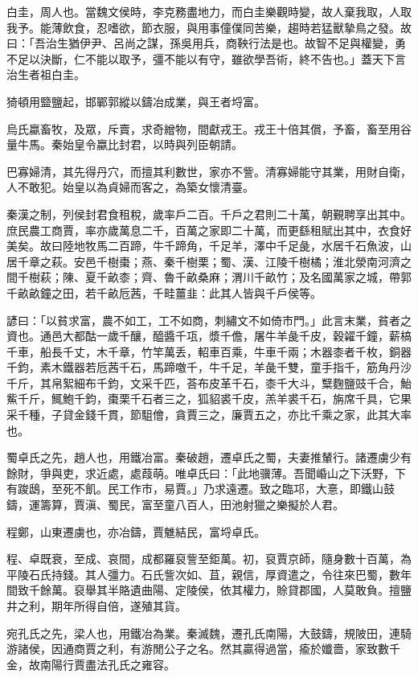 \begin{pinyinscope}
白圭，周人也。當魏文侯時，李克務盡地力，而白圭樂觀時變，故人棄我取，人取我予。能薄飲食，忍嗜欲，節衣服，與用事僮僕同苦樂，趨時若猛獸摯鳥之發。故曰：「吾治生猶伊尹、呂尚之謀，孫吳用兵，商鞅行法是也。故智不足與權變，勇不足以決斷，仁不能以取予，彊不能以有守，雖欲學吾術，終不告也。」蓋天下言治生者祖白圭。

猗頓用盬鹽起，邯鄲郭縱以鑄冶成業，與王者埒富。

烏氏蠃畜牧，及眾，斥賣，求奇繒物，間獻戎王。戎王十倍其償，予畜，畜至用谷量牛馬。秦始皇令蠃比封君，以時與列臣朝請。

巴寡婦清，其先得丹穴，而擅其利數世，家亦不訾。清寡婦能守其業，用財自衛，人不敢犯。始皇以為貞婦而客之，為築女懷清臺。

秦漢之制，列侯封君食租稅，歲率戶二百。千戶之君則二十萬，朝覲聘享出其中。庶民農工商賈，率亦歲萬息二千，百萬之家即二十萬，而更繇租賦出其中，衣食好美矣。故曰陸地牧馬二百蹄，牛千蹄角，千足羊，澤中千足彘，水居千石魚波，山居千章之萩。安邑千樹棗；燕、秦千樹栗；蜀、漢、江陵千樹橘；淮北滎南河濟之間千樹萩；陳、夏千畝桼；齊、魯千畝桑麻；渭川千畝竹；及名國萬家之城，帶郭千畝畝鐘之田，若千畝卮茜，千畦薑韭：此其人皆與千戶侯等。

諺曰：「以貧求富，農不如工，工不如商，刺繡文不如倚市門。」此言末業，貧者之資也。通邑大都酤一歲千釀，醯醬千瓨，漿千儋，屠牛羊彘千皮，穀糴千鐘，薪槁千車，船長千丈，木千章，竹竿萬丢，軺車百乘，牛車千兩；木器桼者千枚，銅器千鈞，素木鐵器若卮茜千石，馬蹄噭千，牛千足，羊彘千雙，童手指千，筋角丹沙千斤，其帛絮細布千鈞，文采千匹，荅布皮革千石，桼千大斗，糱麴鹽豉千合，鮐鮆千斤，鮿鮑千鈞，棗栗千石者三之，狐貂裘千皮，羔羊裘千石，旃席千具，它果采千種，子貸金錢千貫，節駔儈，貪賈三之，廉賈五之，亦比千乘之家，此其大率也。

蜀卓氏之先，趙人也，用鐵冶富。秦破趙，遷卓氏之蜀，夫妻推輦行。諸遷虜少有餘財，爭與吏，求近處，處葭萌。唯卓氏曰：「此地骥薄。吾聞崏山之下沃野，下有踆鴟，至死不飢。民工作市，易賈。」乃求遠遷。致之臨邛，大憙，即鐵山鼓鑄，運籌算，賈滇、蜀民，富至童八百人，田池射獵之樂擬於人君。

程鄭，山東遷虜也，亦冶鑄，賈魋結民，富埒卓氏。

程、卓既衰，至成、哀間，成都羅裒訾至鉅萬。初，裒賈京師，隨身數十百萬，為平陵石氏持錢。其人彊力。石氏訾次如、苴，親信，厚資遣之，令往來巴蜀，數年間致千餘萬。裒舉其半賂遺曲陽、定陵侯，依其權力，賒貸郡國，人莫敢負。擅鹽井之利，期年所得自倍，遂殖其貨。

宛孔氏之先，梁人也，用鐵冶為業。秦滅魏，遷孔氏南陽，大鼓鑄，規陂田，連騎游諸侯，因通商賈之利，有游閒公子之名。然其贏得過當，瘉於孅嗇，家致數千金，故南陽行賈盡法孔氏之雍容。


\end{pinyinscope}
